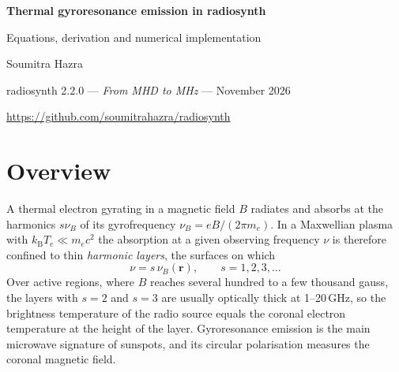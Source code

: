 \documentclass[11pt,a4paper]{article}
\newcommand{\code}[1]{\texttt{#1}}
\newcommand{\vect}[1]{\bm{#1}}
\newcommand{\kB}{k_\mathrm{B}}
\newcommand{\nuB}{\nu_B}
\begin{document}
\begin{center}
{\LARGE\bfseries\color{accent} Thermal gyroresonance emission in \textsf{radiosynth}\par}
\vspace{0.3cm}
{\large Equations, derivation and numerical implementation\par}
\vspace{0.4cm}
{\normalsize Soumitra Hazra\par}
\vspace{0.1cm}
{\small \textsf{radiosynth} 2.2.0 --- \emph{From MHD to MHz} --- November 2026\par}
{\small \url{https://github.com/soumitrahazra/radiosynth}\par}
\end{center}

\begin{abstract}
\noindent This note collects every equation used by \textsf{radiosynth} to compute the
thermal gyroresonance (GR) emission of a magnetohydrodynamic (MHD) model, together with the
magnetised free--free emission that accompanies it, in Stokes $I$ and $V$. It starts from the
cold-plasma magneto-ionic modes, derives the optical depth of a harmonic layer from the
low-temperature expansion of the gyromagnetic absorption coefficient, and then describes how
the code finds the layers along straight lines of sight, how it solves the polarised
radiative transfer for the two circular polarisations (or the two modes), and how it turns
the result into brightness temperatures, polarisation and fluxes. Each section ends with the
corresponding function of the code (\code{radiosynth/gyroresonance/}, \code{common/magnetoionic.py},
\code{bremsstrahlung/magnetized.py}), so that the equations can be checked line by line.
\end{abstract}

\tableofcontents

\section{Overview}

A thermal electron gyrating in a magnetic field $B$ radiates and absorbs at the harmonics
$s\nuB$ of its gyrofrequency $\nuB=eB/(2\pi m_e)$. In a Maxwellian plasma with
$\kB T_e\ll m_ec^2$ the absorption at a given observing frequency $\nu$ is therefore confined
to thin \emph{harmonic layers}, the surfaces on which
\begin{equation}
  \nu = s\,\nuB(\vect r), \qquad s=1,2,3,\ldots
  \label{eq:resonance}
\end{equation}
Over active regions, where $B$ reaches several hundred to a few thousand gauss, the
layers with $s=2$ and $s=3$ are usually optically thick at 1--20\,GHz, so the brightness
temperature of the radio source equals the coronal electron temperature at the height of the
layer. Gyroresonance emission is the main microwave signature of sunspots, and its circular
polarisation measures the coronal magnetic field.
\end{document}
